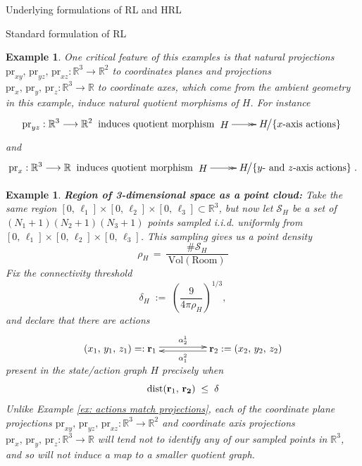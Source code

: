\documentclass[11pt]{article}
\newtheorem{example}[subsubsection]{Example}
\begin{document}
\begin{section}{Underlying formulations of RL and HRL}
\begin{subsection}{Standard formulation of RL}
\begin{example}
One critical feature of this examples is that natural projections $\text{pr}_{xy},\,\text{pr}_{yz},\,\text{pr}_{xz}:\mathbb{R}^{3}\longrightarrow\mathbb{R}^{2}$ to coordinates planes and projections $\text{pr}_{x},\,\text{pr}_{y},\,\text{pr}_{z}:\mathbb{R}^{3}\longrightarrow\mathbb{R}$ to coordinate axes, which come from the ambient geometry in this example, induce natural quotient morphisms of $H$. For instance
$$
\text{pr}_{yz}:\mathbb{R}^{3}\longrightarrow\mathbb{R}^2
\;\;\text{induces quotient morphism}\;
\begin{xy}
(0,0)*+{H}="1";
(27,0)*+{H\!\big/\{x\text{-axis actions}\}}="2";
{\ar@{->>} "1"; "2"};
\end{xy}
$$
and
$$
\text{pr}_{x}:\mathbb{R}^{3}\longrightarrow\mathbb{R}
\;\;\text{induces quotient morphism}\;
\begin{xy}
(0,0)*+{H}="1";
(33,0)*+{H\!\big/\{y\text{- and }z\text{-axis actions}\}}="2";
{\ar@{->>} "1"; "2"};
\end{xy}.
$$
\end{example}


\begin{example}\label{ex: point cloud}
{\bf Region of 3-dimensional space as a point cloud:}
\normalfont
Take the same region $[0,\,\ell_1]\times[0,\,\ell_2]\times[0,\,\ell_3]\subset\mathbb{R}^{3}$, but now let $\mathcal{S}_{H}$ be a set of $(N_{1}+1)(N_{2}+1)(N_{3}+1)$ points sampled i.i.d. uniformly from $[0,\,\ell_1]\times[0,\,\ell_2]\times[0,\,\ell_3]$. This sampling gives us a {\em point density}
$$
\rho_{H}\,=\,\frac{\#\mathcal{S}_{H}}{\ \text{Vol}(\text{Room})\ }
$$
Fix the {\em connectivity threshold}
$$
\delta_{H}
\;:=\;
\left(
\frac{9}{4\pi\rho_{H}}
\right)^{\!1/3},
$$
and declare that there are actions
$$
\begin{xy}
(0,0)*+{(x_{1},\,y_{1},\,z_{1})=:\bold{r}_{1}}="1";
(45,0)*+{\bold{r}_{2}:=(x_{2},\,y_{2},\,z_{2})}="2";
{\ar@<2pt>^{\alpha^{1}_{2}} "1"; "2"}
{\ar@<2pt>^{\alpha^{2}_{1}} "2"; "1"}
\end{xy}
$$
present in the state/action graph $H$ precisely when
$$
\text{dist}(\bold{r}_{1},\,\bold{r_{2}})
\;\le\;\delta
$$
Unlike Example \ref{ex: actions match projections},  each of the coordinate plane projections $\text{pr}_{xy},\,\text{pr}_{yz},\,\text{pr}_{xz}:\mathbb{R}^{3}\longrightarrow\mathbb{R}^{2}$ and coordinate axis projections $\text{pr}_{x},\,\text{pr}_{y},\,\text{pr}_{z}:\mathbb{R}^{3}\longrightarrow\mathbb{R}$ will tend not to identify any of our sampled points in $\mathbb{R}^{3}$, and so will not induce a map to a smaller quotient graph.
\end{example}


\end{subsection}
\end{section}
\end{document}
